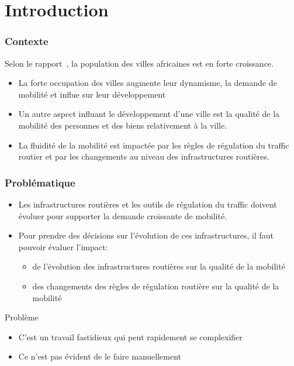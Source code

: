 \section{Introduction}\label{sec:section-1}
\begin{frame}
    \frametitle{Contexte}
    Selon le rapport~\autocite{somik2017opening}, la population des villes africaines est en forte croissance.

    \begin{itemize}
        \item La forte occupation des villes augmente leur dynamisme, la demande de mobilité et influe sur leur développement
        \item Un autre aspect influant le développement d'une ville est la qualité de la mobilité des personnes et des biens relativement à la ville.
        \item La fluidité de la mobilité est impactée par les règles de régulation du traffic routier et par les changements au niveau des infrastructures routières.
    \end{itemize}

\end{frame}

\begin{frame}
    \frametitle{Problématique}

    \begin{itemize}
        \item Les infrastructures routières et les outils de régulation du traffic doivent évoluer pour supporter la demande croissante de mobilité.
        \item Pour prendre des décisions sur l'évolution de ces infrastructures, il faut pouvoir évaluer l'impact:
        \begin{itemize}
            \item de l'évolution des infrastructures routières sur la qualité de la mobilité
            \item des changements des règles de régulation routière sur la qualité de la mobilité
        \end{itemize}
    \end{itemize}
    \begin{alertblock}{Problème}

        \begin{itemize}
            \item C'est un travail fastidieux qui peut rapidement se complexifier
            \item Ce n'est pas évident de le faire manuellement
        \end{itemize}
    \end{alertblock}
\end{frame}

